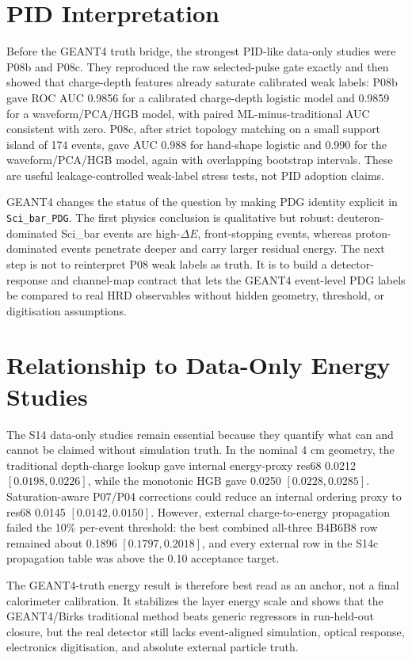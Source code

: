 \section{PID Interpretation}

Before the GEANT4 truth bridge, the strongest PID-like data-only studies were
P08b and P08c. They reproduced the raw selected-pulse gate exactly and then
showed that charge-depth features already saturate calibrated weak labels:
P08b gave ROC AUC 0.9856 for a calibrated charge-depth logistic model and
0.9859 for a waveform/PCA/HGB model, with paired ML-minus-traditional AUC
consistent with zero. P08c, after strict topology matching on a small support
island of 174 events, gave AUC 0.988 for hand-shape logistic and 0.990 for the
waveform/PCA/HGB model, again with overlapping bootstrap intervals. These are
useful leakage-controlled weak-label stress tests, not PID adoption claims.

GEANT4 changes the status of the question by making PDG identity explicit in
\texttt{Sci\_bar\_PDG}. The first physics conclusion is qualitative but robust:
deuteron-dominated Sci\_bar events are high-\(\Delta E\), front-stopping events,
whereas proton-dominated events penetrate deeper and carry larger residual
energy. The next step is not to reinterpret P08 weak labels as truth. It is to
build a detector-response and channel-map contract that lets the GEANT4
event-level PDG labels be compared to real HRD observables without hidden
geometry, threshold, or digitisation assumptions.

\section{Relationship to Data-Only Energy Studies}

The S14 data-only studies remain essential because they quantify what can and
cannot be claimed without simulation truth. In the nominal 4 cm geometry,
the traditional depth-charge lookup gave internal energy-proxy res68 0.0212
\([0.0198,0.0226]\), while the monotonic HGB gave 0.0250
\([0.0228,0.0285]\). Saturation-aware P07/P04 corrections could reduce an
internal ordering proxy to res68 0.0145 \([0.0142,0.0150]\). However, external
charge-to-energy propagation failed the 10\% per-event threshold: the best
combined all-three B4B6B8 row remained about 0.1896
\([0.1797,0.2018]\), and every external row in the S14c propagation table was
above the 0.10 acceptance target.

The GEANT4-truth energy result is therefore best read as an anchor, not a final
calorimeter calibration. It stabilizes the layer energy scale and shows that the
GEANT4/Birks traditional method beats generic regressors in run-held-out closure,
but the real detector still lacks event-aligned simulation, optical response,
electronics digitisation, and absolute external particle truth.

